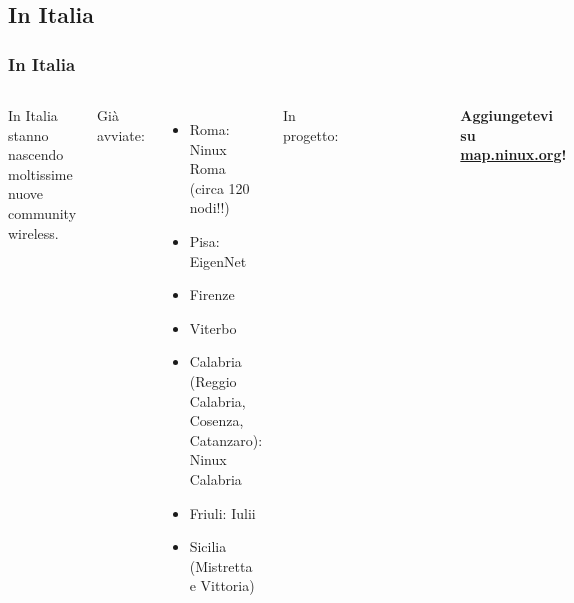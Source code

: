 \documentclass{beamer}
\begin{document}
\subsection{In Italia}
\begin{frame}\frametitle{In Italia}
\begin{columns}
In Italia stanno nascendo moltissime nuove community wireless.

\vspace{10pt}
Già avviate:
\begin{itemize}
 \item Roma: Ninux Roma (circa 120 nodi!!)
 \item Pisa: EigenNet
 \item Firenze
 \item Viterbo
 \item Calabria (Reggio Calabria, Cosenza, Catanzaro):\\Ninux Calabria
 \item Friuli: Iulii
 \item Sicilia (Mistretta e Vittoria) 
\end{itemize}

In progetto:\vspace{-10pt}
\begin{figure}{}\end{figure}
\vspace{-10pt}\hspace{5pt}\textbf{\Large\color{red}Aggiungetevi su\\ \hspace{10pt}\url{map.ninux.org}!}
\end{columns}
\end{frame}
\end{document}
